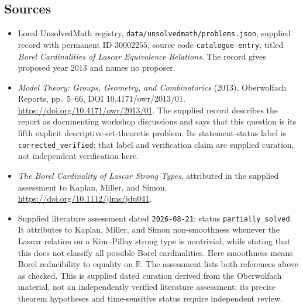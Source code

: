 \documentclass[11pt]{article}
\newcommand{\R}{\mathbb{R}}
\begin{document}
\subsection{Sources}
\begin{itemize}
\item Local UnsolvedMath registry, \texttt{data/unsolvedmath/problems.json}, supplied record with permanent ID \(30002255\), source code \texttt{catalogue entry}, titled \emph{Borel Cardinalities of Lascar Equivalence Relations}. The record gives proposed year 2013 and names no proposer.
\item \emph{Model Theory: Groups, Geometry, and Combinatorics} (2013), Oberwolfach Reports, pp.~5--66, DOI 10.4171/owr/2013/01. \url{https://doi.org/10.4171/owr/2013/01}. The supplied record describes the report as documenting workshop discussions and says that this question is its fifth explicit descriptive-set-theoretic problem. Its statement-status label is \texttt{corrected\_verified}; that label and verification claim are supplied curation, not independent verification here.
\item \emph{The Borel Cardinality of Lascar Strong Types}, attributed in the supplied assessment to Kaplan, Miller, and Simon. \url{https://doi.org/10.1112/jlms/jdu041}.
\item Supplied literature assessment dated \texttt{2026-08-21}: status \texttt{partially\_solved}. It attributes to Kaplan, Miller, and Simon non-smoothness whenever the Lascar relation on a Kim--Pillay strong type is nontrivial, while stating that this does not classify all possible Borel cardinalities. Here smoothness means Borel reducibility to equality on \(\R\). The assessment lists both references above as checked. This is supplied dated curation derived from the Oberwolfach material, not an independently verified literature assessment; its precise theorem hypotheses and time-sensitive status require independent review.
\end{itemize}
\end{document}

